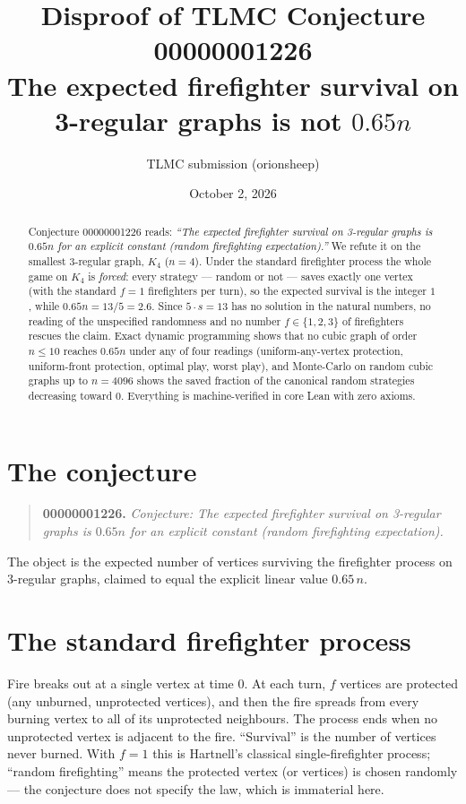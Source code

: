 \documentclass[11pt]{article}
\title{Disproof of TLMC Conjecture 00000001226\\
\large The expected firefighter survival on 3-regular graphs
is not $0.65n$}
\author{TLMC submission (orionsheep)}
\date{October 2, 2026}
\theoremstyle{plain}
\begin{document}
\maketitle

\begin{abstract}
Conjecture 00000001226 reads: \emph{``The expected firefighter survival on
3-regular graphs is $0.65n$ for an explicit constant (random firefighting
expectation).''}  We refute it on the smallest 3-regular graph, $K_4$
($n=4$).  Under the standard firefighter process the whole game on $K_4$ is
\emph{forced}: every strategy --- random or not --- saves exactly one vertex
(with the standard $f=1$ firefighters per turn), so the expected survival is
the integer $1$, while $0.65n = 13/5 = 2.6$.  Since $5\cdot s = 13$ has no
solution in the natural numbers, no reading of the unspecified randomness
and no number $f\in\{1,2,3\}$ of firefighters rescues the claim.  Exact
dynamic programming shows that no cubic graph of order $n\le 10$ reaches
$0.65n$ under any of four readings (uniform-any-vertex protection,
uniform-front protection, optimal play, worst play), and Monte-Carlo on
random cubic graphs up to $n=4096$ shows the saved fraction of the canonical
random strategies decreasing toward $0$.  Everything is machine-verified in
core Lean with zero axioms.
\end{abstract}

\section{The conjecture}

\begin{quote}
\textbf{00000001226.} \emph{Conjecture: The expected firefighter survival on
3-regular graphs is $0.65n$ for an explicit constant (random firefighting
expectation).}
\end{quote}

The object is the expected number of vertices surviving the firefighter
process on 3-regular graphs, claimed to equal the explicit linear value
$0.65\,n$.

\section{The standard firefighter process}

Fire breaks out at a single vertex at time $0$.  At each turn, $f$ vertices
are protected (any unburned, unprotected vertices), and then the fire
spreads from every burning vertex to all of its unprotected neighbours.
The process ends when no unprotected vertex is adjacent to the fire.
``Survival'' is the number of vertices never burned.  With $f=1$ this is
Hartnell's classical single-firefighter process; ``random firefighting''
means the protected vertex (or vertices) is chosen randomly --- the
conjecture does not specify the law, which is immaterial here.
\end{document}
